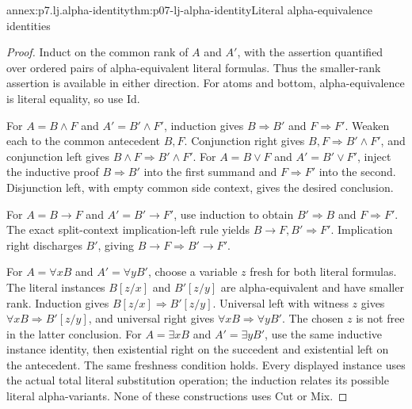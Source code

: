 \begin{annexitem}{annex:p7.lj.alpha-identity}{thm:p07-lj-alpha-identity}{Literal alpha-equivalence identities}
\begin{proof}
Induct on the common rank of \(A\) and \(A'\), with the assertion
quantified over ordered pairs of alpha-equivalent literal formulas.
Thus the smaller-rank assertion is available in either direction.
For atoms and bottom, alpha-equivalence is literal equality, so use Id.

For \(A=B\land F\) and \(A'=B'\land F'\), induction gives
\(B\Rightarrow B'\) and \(F\Rightarrow F'\).  Weaken each
to the common antecedent \(B,F\).  Conjunction right gives
\(B,F\Rightarrow B'\land F'\), and conjunction left gives
\(B\land F\Rightarrow B'\land F'\).
For \(A=B\lor F\) and \(A'=B'\lor F'\), inject the inductive
proof \(B\Rightarrow B'\) into the first summand and
\(F\Rightarrow F'\) into the second.  Disjunction left, with
empty common side context, gives the desired conclusion.

For \(A=B\to F\) and \(A'=B'\to F'\), use induction to
obtain \(B'\Rightarrow B\) and \(F\Rightarrow F'\).
The exact split-context implication-left rule yields
\(B\to F,B'\Rightarrow F'\).  Implication right discharges
\(B'\), giving \(B\to F\Rightarrow B'\to F'\).

For \(A=\forall xB\) and \(A'=\forall yB'\), choose a variable
\(z\) fresh for both literal formulas.  The literal instances
\(B[z/x]\) and \(B'[z/y]\) are alpha-equivalent and have smaller
rank.  Induction gives \(B[z/x]\Rightarrow B'[z/y]\).
Universal left with witness \(z\) gives
\(\forall xB\Rightarrow B'[z/y]\), and universal right gives
\(\forall xB\Rightarrow\forall yB'\).  The chosen \(z\)
is not free in the latter conclusion.
For \(A=\exists xB\) and \(A'=\exists yB'\), use the same
inductive instance identity, then existential right on the succedent
and existential left on the antecedent.  The same freshness condition
holds.  Every displayed instance uses the actual total literal
substitution operation; the induction relates its possible literal
alpha-variants.  None of these constructions uses Cut or Mix.
\end{proof}
\end{annexitem}

